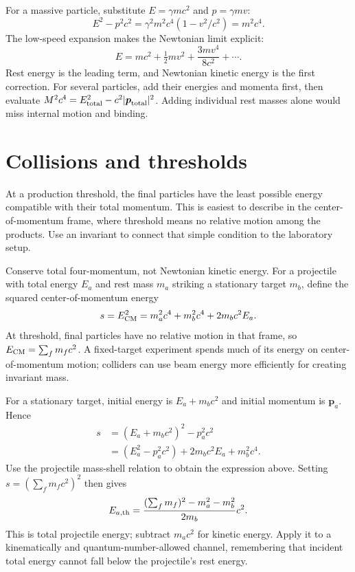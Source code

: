 \documentclass[11pt,oneside]{book}
\newcommand{\vect}[1]{\boldsymbol{#1}}
\theoremstyle{reviewstyle}
\begin{document}
For a massive particle, substitute $E=\gamma mc^2$ and $p=\gamma mv$:
\begin{equation}
E^2-p^2c^2=\gamma^2m^2c^4(1-v^2/c^2)=m^2c^4.
\end{equation}
The low-speed expansion makes the Newtonian limit explicit:
\begin{equation}
E=mc^2+\tfrac12mv^2+\frac{3mv^4}{8c^2}+\cdots.
\end{equation}
Rest energy is the leading term, and Newtonian kinetic energy is the first correction. For several particles, add their energies and momenta first, then evaluate $M^2c^4=E_{\rm total}^2-c^2|\vect p_{\rm total}|^2$. Adding individual rest masses alone would miss internal motion and binding.

\section{Collisions and thresholds}
At a production threshold, the final particles have the least possible energy compatible with their total momentum. This is easiest to describe in the center-of-momentum frame, where threshold means no relative motion among the products. Use an invariant to connect that simple condition to the laboratory setup.

Conserve total four-momentum, not Newtonian kinetic energy. For a projectile with total energy $E_a$ and rest mass $m_a$ striking a stationary target $m_b$, define the squared center-of-momentum energy
\begin{equation}s=E_{\rm CM}^2=m_a^2c^4+m_b^2c^4+2m_bc^2E_a.\end{equation}
At threshold, final particles have no relative motion in that frame, so $E_{\rm CM}=\sum_fm_fc^2$. A fixed-target experiment spends much of its energy on center-of-momentum motion; colliders can use beam energy more efficiently for creating invariant mass.

For a stationary target, initial energy is $E_a+m_bc^2$ and initial momentum is $\vect p_a$. Hence
\begin{align}
s&=(E_a+m_bc^2)^2-p_a^2c^2\\
&=(E_a^2-p_a^2c^2)+2m_bc^2E_a+m_b^2c^4.
\end{align}
Use the projectile mass-shell relation to obtain the expression above. Setting $s=(\sum_fm_fc^2)^2$ then gives
\begin{equation}
E_{a,\rm th}=\frac{(\sum_fm_f)^2-m_a^2-m_b^2}{2m_b}c^2.
\end{equation}
This is total projectile energy; subtract $m_ac^2$ for kinetic energy. Apply it to a kinematically and quantum-number-allowed channel, remembering that incident total energy cannot fall below the projectile's rest energy.
\end{document}
